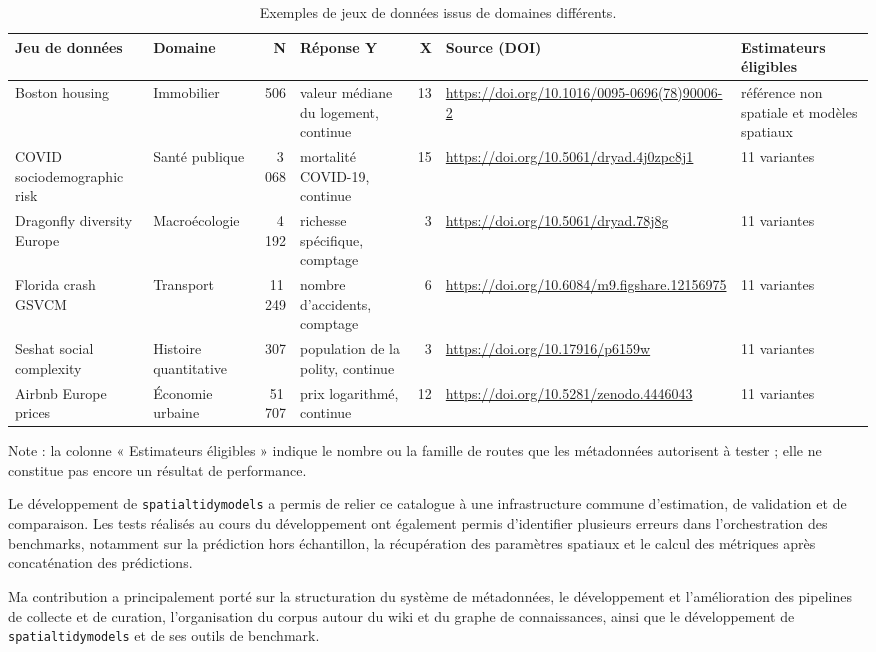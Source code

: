 \documentclass[11pt,a4paper]{article}
\begin{document}
\begin{table}[htbp]
\centering
\footnotesize
\begin{tabularx}{\textwidth}{@{}p{2.6cm}p{2.0cm}rXrp{2.6cm}p{1.8cm}@{}}
\toprule
Jeu de données & Domaine & N & Réponse Y & X & Source (DOI) & Estimateurs éligibles \\
\midrule
Boston housing & Immobilier & 506 & valeur médiane du logement, continue & 13 & \url{https://doi.org/10.1016/0095-0696(78)90006-2} & référence non spatiale et modèles spatiaux \\
COVID sociodemographic risk & Santé publique & 3\,068 & mortalité COVID-19, continue & 15 & \url{https://doi.org/10.5061/dryad.4j0zpc8j1} & 11 variantes \\
Dragonfly diversity Europe & Macroécologie & 4\,192 & richesse spécifique, comptage & 3 & \url{https://doi.org/10.5061/dryad.78j8g} & 11 variantes \\
Florida crash GSVCM & Transport & 11\,249 & nombre d'accidents, comptage & 6 & \url{https://doi.org/10.6084/m9.figshare.12156975} & 11 variantes \\
Seshat social complexity & Histoire quantitative & 307 & population de la polity, continue & 3 & \url{https://doi.org/10.17916/p6159w} & 11 variantes \\
Airbnb Europe prices & Économie urbaine & 51\,707 & prix logarithmé, continue & 12 & \url{https://doi.org/10.5281/zenodo.4446043} & 11 variantes \\
\bottomrule
\end{tabularx}
\vspace{0.15cm}

\raggedright\scriptsize Note : la colonne « Estimateurs éligibles » indique le nombre ou la famille de routes que les métadonnées autorisent à tester ; elle ne constitue pas encore un résultat de performance.
\caption{Exemples de jeux de données issus de domaines différents.}
\label{tab:jeux-diversite}
\end{table}

Le développement de \texttt{spatialtidymodels} a permis de relier ce catalogue à une infrastructure commune d'estimation, de validation et de comparaison. Les tests réalisés au cours du développement ont également permis d'identifier plusieurs erreurs dans l'orchestration des benchmarks, notamment sur la prédiction hors échantillon, la récupération des paramètres spatiaux et le calcul des métriques après concaténation des prédictions.

Ma contribution a principalement porté sur la structuration du système de métadonnées, le développement et l'amélioration des pipelines de collecte et de curation, l'organisation du corpus autour du wiki et du graphe de connaissances, ainsi que le développement de \texttt{spatialtidymodels} et de ses outils de benchmark.
\end{document}
